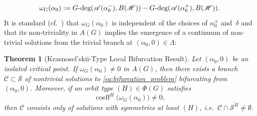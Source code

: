 \documentclass[twoside]{article}%
\def\gdeg{G\text{\rm -deg}}
\newtheorem{theorem}{Theorem}[section]
\begin{document}
\begin{equation*}
  \omega_G(\alpha_0)
  := \gdeg(\mathscr A(\alpha_0^-), B(\mathscr H))
   - \gdeg(\mathscr A(\alpha_0^+), B(\mathscr H)).
\end{equation*}
It is standard (cf.~\cite{book-new, AED}) that
$\omega_G(\alpha_0)$ is independent of the choices of
$\alpha_0^\pm$ and~$\delta$ and that its non-triviality in $A(G)$ implies the emergence of a continuum of non-trivial solutions from the trivial branch at $(\alpha_0,0) \in \Lambda$:
\begin{theorem}[Krasnosel'skii-Type Local Bifurcation Result]\label{thm:abstract_local_bif}
Let $(\alpha_0,0)$ be an isolated critical point. If $\omega_{G}(\alpha_0)\neq 0$ in $A(G)$, then there exists a branch $\mathscr C\subset \overline{\mathscr S}$ of nontrivial solutions to \eqref{eq:bifurcation_problem} bifurcating from $(\alpha_0,0)$. Moreover, if an orbit type $(H)\in\Phi(G)$ satisfies 
    \[
\operatorname{coeff}^{H}\big(\omega_{G}(\alpha_0)\big)\neq 0,
\]
then $\mathscr C$ consists only of solutions with symmetries at least $(H)$, i.e.\ $\mathscr C\cap\overline{\mathscr S^H}\neq\emptyset$.
\end{theorem}
\end{document}

